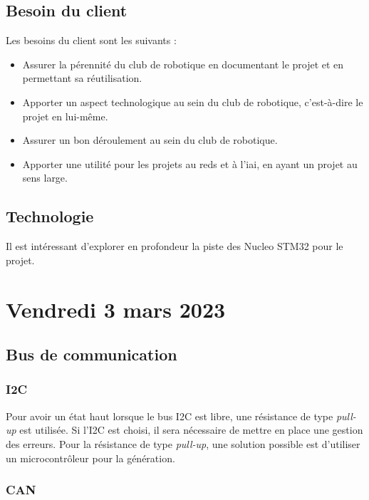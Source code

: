 \subsection{Besoin du client}

Les besoins du client sont les suivants :
\begin{itemize}
    \item Assurer la pérennité du club de robotique en documentant le projet et en permettant sa réutilisation.
    \item Apporter un aspect technologique au sein du club de robotique, c'est-à-dire le projet en lui-même.
    \item Assurer un bon déroulement au sein du club de robotique.
    \item Apporter une utilité pour les projets au \gls{reds} et à l'\gls{iai}, en ayant un projet au sens large.
\end{itemize}

\subsection{Technologie}

Il est intéressant d'explorer en profondeur la piste des Nucleo STM32 pour le projet.

\section{Vendredi 3 mars 2023}

\subsection{Bus de communication}

\subsubsection{I2C}

Pour avoir un état haut lorsque le bus I2C est libre, une résistance de type \textit{pull-up} est utilisée.
Si l'I2C est choisi, il sera nécessaire de mettre en place une gestion des erreurs.
Pour la résistance de type \textit{pull-up}, une solution possible est d'utiliser un microcontrôleur pour la génération.

\subsubsection{CAN}

